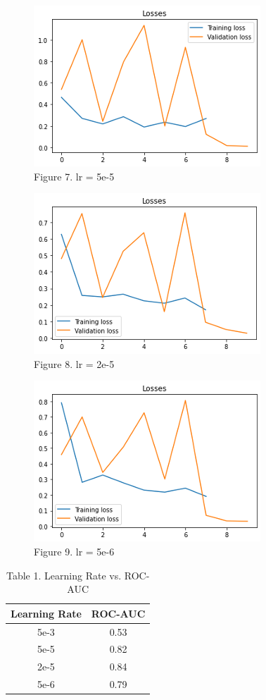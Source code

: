 \documentclass[11pt,a4paper]{article}
\begin{document}
\begin{figure}[!htb]
	\centering
	\includegraphics{figures/figure7.png}
	\caption{\label{fig:my-label} Figure 7. lr = 5e-5}
\end{figure}

\begin{figure}[!htb]
	\centering
	\includegraphics{figures/figure8.png}
	\caption{\label{fig:my-label} Figure 8. lr = 2e-5}
\end{figure}

\begin{figure}[!htb]
	\centering
	\includegraphics{figures/figure9.png}
	\caption{\label{fig:my-label} Figure 9. lr = 5e-6}
\end{figure}

\begin{table}[!htbp]
	\centering
	\begin{tabular}{|c|c|}
		\hline
		{Learning Rate} & {ROC-AUC} \\ \hline
		5e-3                   & 0.53             \\ \hline
		5e-5                   & 0.82             \\ \hline
		2e-5                   & 0.84             \\ \hline
		5e-6                   & 0.79             \\ \hline
	\end{tabular}
	\caption{Table 1. Learning Rate vs. ROC-AUC}
\end{table}
\end{document}

